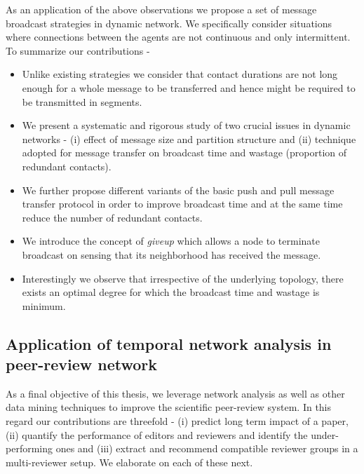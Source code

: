 As an application of the above observations we propose a set of message broadcast strategies in dynamic network. We specifically consider situations where connections between the agents are not continuous and only intermittent. To summarize our contributions -  

\begin{itemize}
 \item Unlike existing strategies we consider that contact durations are not long enough for a whole message to be transferred and hence might be required to be transmitted in segments.
 \item We present a systematic and rigorous study of two crucial issues in dynamic networks - (i) effect of message size and partition structure and (ii) technique adopted for message transfer on broadcast time and wastage (proportion of redundant contacts).
 \item We further propose different variants of the basic push and pull message transfer protocol in order to improve broadcast time and at the same time reduce the number of redundant contacts.
 \item We introduce the concept of {\em giveup} which allows a node to terminate broadcast on sensing that its neighborhood has received the message.
 \item Interestingly we observe that irrespective of the underlying topology, there exists an optimal degree for which the broadcast time and wastage is minimum.
 
\end{itemize}


\subsection{Application of temporal network analysis in peer-review network}
As a final objective of this thesis, we leverage network analysis as well as other data mining techniques to improve the scientific peer-review system. In this regard our contributions are threefold - (i) predict long term impact of a paper, (ii) quantify the performance of editors and reviewers and identify the under-performing ones and (iii) extract and recommend compatible reviewer groups in a multi-reviewer setup. We elaborate on each of these next.

